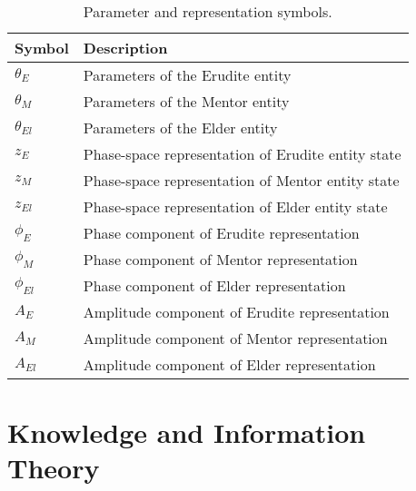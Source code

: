 \begin{table}[h]
\centering
\begin{tabular}{|l|p{10cm}|}
\hline
\textbf{Symbol} & \textbf{Description} \\
\hline
$\theta_E$ & Parameters of the Erudite entity \\
\hline
$\theta_M$ & Parameters of the Mentor entity \\
\hline
$\theta_{El}$ & Parameters of the Elder entity \\
\hline
$z_E$ & Phase-space representation of Erudite entity state \\
\hline
$z_M$ & Phase-space representation of Mentor entity state \\
\hline
$z_{El}$ & Phase-space representation of Elder entity state \\
\hline
$\phi_E$ & Phase component of Erudite representation \\
\hline
$\phi_M$ & Phase component of Mentor representation \\
\hline
$\phi_{El}$ & Phase component of Elder representation \\
\hline
$A_E$ & Amplitude component of Erudite representation \\
\hline
$A_M$ & Amplitude component of Mentor representation \\
\hline
$A_{El}$ & Amplitude component of Elder representation \\
\hline
\end{tabular}
\caption{Parameter and representation symbols.}
\label{tab:symbols_params}
\end{table}

\section{Knowledge and Information Theory}


